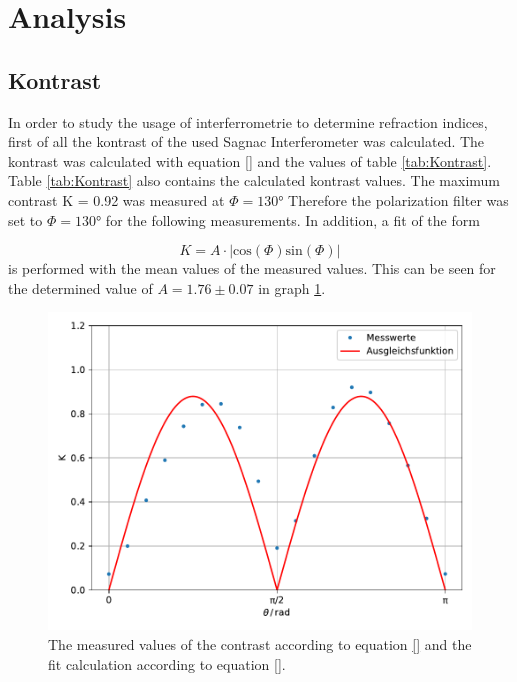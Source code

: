 \section{Analysis}
\label{sec:Auswertung}

\subsection{Kontrast}
\label{sec:Kontrast}

In order to study the usage of interferrometrie to determine refraction indices, first of all the kontrast of the used Sagnac Interferometer was calculated.
The kontrast was calculated with equation \eqref{} and the values of table \ref{tab:Kontrast}.
Table \ref{tab:Kontrast} also contains the calculated kontrast values.
The maximum contrast K = 0.92 was measured at $\Phi = 130°$
Therefore the polarization filter was set to $\Phi = 130°$ for the following measurements.
In addition, a fit of the form 

\begin{equation}
K = A \cdot |\text{cos}(\Phi) \text{sin}(\Phi)|
\end{equation}
is performed with the mean values of the measured values.
This can be seen for the determined value of $A = 1.76 \pm 0.07$ in graph \ref{fig:Kontrast_Ausgleich}.

\begin{figure}[H]
  \centering
  \includegraphics[width=\textwidth]{plots/kontrast_ausgleich.pdf}
  \caption{The measured values of the contrast according to equation \eqref{} and the fit calculation according to equation \eqref{}.}
  \label{fig:Kontrast_Ausgleich}
\end{figure}

